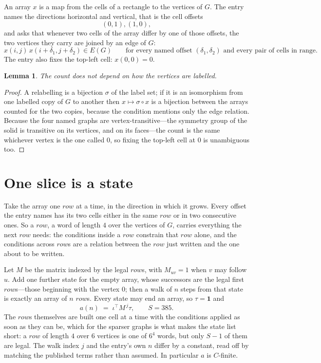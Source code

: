 \documentclass[11pt,a4paper]{article}
\theoremstyle{plain}
\newtheorem{lemma}[theorem]{Lemma}
\theoremstyle{definition}
\begin{document}
An array $x$ is a map from the cells of a rectangle to the vertices of $G$. The entry names the
directions horizontal and vertical, that is the cell offsets
\[
(0,1), (1,0),
\]
and asks that whenever two cells of the array differ by one of those offsets, the two vertices
they carry are joined by an edge of $G$:
\[
x(i,j)\,x(i+\delta_1,j+\delta_2)\in E(G)\qquad
\text{for every named offset } (\delta_1,\delta_2)\text{ and every pair of cells in range.}
\]
The entry also fixes the top-left cell: $x(0,0)=0$.

\begin{lemma}\label{lem:label}
The count does not depend on how the vertices are labelled.
\end{lemma}

\begin{proof}
A relabelling is a bijection $\sigma$ of the label set; if it is an isomorphism from one
labelled copy of $G$ to another then $x\mapsto\sigma\circ x$ is a bijection between the arrays
counted for the two copies, because the condition mentions only the edge relation.
Because the four named graphs are vertex-transitive---the symmetry group of the solid is transitive on its vertices, and on its faces---the count is the same whichever vertex is the one called $0$, so fixing the top-left cell at $0$ is unambiguous too.
\end{proof}

\section{One slice is a state}

Take the array one $row$ at a time, in the direction in which it grows.
Every offset the entry names has its two cells either in the same $row$ or in two
consecutive ones. So a $row$, a word of length $4$ over the vertices of $G$, carries
everything the next $row$ needs: the conditions inside a $row$ constrain that
$row$ alone, and the conditions across $row$s are a relation between the
$row$ just written and the one about to be written.

Let $M$ be the matrix indexed by the legal $row$s, with $M_{uv}=1$ when $v$ may
follow $u$. Add one further state for the empty array, whose successors are the legal first
$row$s---those beginning with the vertex $0$; then a walk of
$n$ steps from that state is exactly an array of $n$ $row$s. Every state may end an
array, so $\tau=\mathbf{1}$ and
\[
a(n)\;=\;\iota^{\!\top}M^{\,j}\tau ,\qquad S=385.
\]
The $row$s themselves are built one cell at a time with the conditions applied as soon
as they can be, which for the sparser graphs is what makes the state list short: a $row$
of length $4$ over $6$ vertices is one of $6^{4}$ words, but only $S-1$ of them are
legal. The walk index $j$ and the entry's own $n$ differ by a constant, read off by matching the
published terms rather than assumed. In particular $a$ is $C$-finite.
\end{document}

